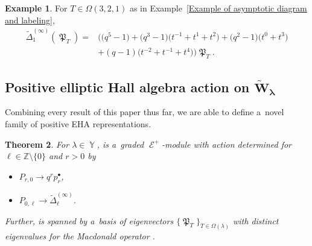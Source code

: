 \documentclass[10pt,a4paper]{amsart}
\numberwithin{equation}{section}
\newtheorem{Theorem}{Theorem}[section]
\theoremstyle{definition}
\newtheorem{Example}[Theorem]{Example}
\DeclareMathOperator{\Par}{\mathbb{Y}}
\DeclareMathOperator{\MacD}{\mathfrak{P}}
\DeclareMathOperator{\sE}{\mathcal{E}}
\begin{document}
\begin{Example}
 For $T \in \Omega(3,2,1)$ as in Example~\ref{Example of asymptotic diagram and labeling},
 \begin{align*}
 \widetilde{\Delta}_{1}^{(\infty)}(\MacD_T) ={}& \bigl( \bigl(q^5-1\bigr) + \bigl(q^3-1\bigr)\bigl(t^{-1}+t^1+t^2\bigr) + \bigl(q^2-1\bigr)\bigl(t^0+t^3\bigr)\\
 &+ (q-1)\bigl(t^{-2}+t^{-1}+t^4\bigr)\bigr)\MacD_T.
 \end{align*}

\end{Example}


\subsection[Positive elliptic Hall algebra action on W\_lambda]{Positive elliptic Hall algebra action on $\boldsymbol{\widetilde{W}_{\lambda}}$}

Combining every result of this paper thus far, we are able to define a~novel family of positive EHA representations.


\begin{Theorem} \label{positive EHA module}
 For $\lambda \in \Par$,  is a~graded $\sE^{+}$-module with action determined for $\ell \in \mathbb{Z}\setminus \{0\}$ and $r>0$ by
 \begin{itemize}
\itemsep=0pt
 \item $P_{r,0} \rightarrow q^{r} p_{r}^{\bullet}$,
 \item $P_{0,\ell} \rightarrow \widetilde{\Delta}_{\ell}^{(\infty)}$.
 \end{itemize}
 Further,  is spanned by a~basis of eigenvectors $\{ \MacD_{T}\}_{T \in \Omega(\lambda)}$ with distinct eigenvalues for the Macdonald operator .
\end{Theorem}
\end{document}
